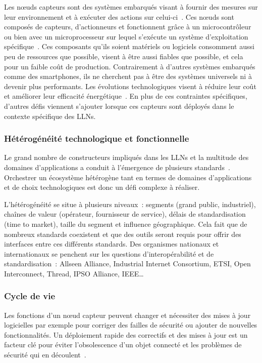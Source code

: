 Les nœuds capteurs sont des systèmes embarqués visant à fournir des mesures sur leur environnement et à exécuter des actions sur celui-ci~\cite{kopetz2011real}.
Ces nœuds sont composés de capteurs, d'actionneurs et fonctionnent grâce à un microcontrôleur ou bien avec un microprocesseur sur lequel s’exécute un système d'exploitation spécifique~\cite{dunkels2004contiki}.
Ces composants qu'ils soient matériels ou logiciels consomment aussi peu de ressources que possible, visent à être aussi fiables que possible, et cela pour un faible coût de production.
Contrairement à d'autres systèmes embarqués comme des smartphones, ils ne cherchent pas à être des systèmes universels ni à devenir plus performants.
Les évolutions technologiques visent à réduire leur coût et améliorer leur efficacité énergétique~\cite{koomey2011implications}.
En plus de ces contraintes spécifiques, d'autres défis viennent s'ajouter lorsque ces capteurs sont déployés dans le contexte spécifique des \ac{LLN}s.

\subsubsection{Hétérogénéité technologique et fonctionnelle}

Le grand nombre de constructeurs impliqués dans les \ac{LLN}s et la multitude des domaines d'applications a conduit à l'émergence de plusieurs standards~\cite{bandyopadhyay2011internet}.
Orchestrer un écosystème hétérogène tant en termes de domaines d'applications et de choix technologiques est donc un défi complexe à réaliser.

L'hétérogénéité se situe à plusieurs niveaux~: segments (grand public, industriel), chaînes de valeur (opérateur, fournisseur de service), délais de standardisation (time to market), taille du segment et influence géographique.
Cela fait que de nombreux standards coexistent et que des outils seront requis pour offrir des interfaces entre ces différents standards.
Des organismes nationaux et internationaux se penchent sur les questions d'interopérabilité et de standardisation~: Allseen Alliance, Industrial Internet Consortium, ETSI, Open Interconnect, Thread, IPSO Alliance, IEEE\ldots

\subsubsection{Cycle de vie}

Les fonctions d'un nœud capteur peuvent changer et nécessiter des mises à jour logicielles par exemple pour corriger des failles de sécurité ou ajouter de nouvelles fonctionnalités.
Un déploiement rapide des correctifs et des mises à jour est un facteur clé pour éviter l’obsolescence d'un objet connecté et les problèmes de sécurité qui en découlent~\cite{pathan2006security, wang2006survey}.

